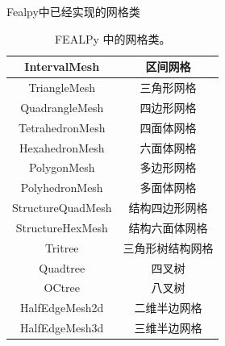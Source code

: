 Fealpy中已经实现的网格类
\begin{table}[H]
	\centering
	\begin{tabular}[c]{|c|c|}\hline
		IntervalMesh      & 区间网格        \\\hline
		TriangleMesh      & 三角形网格       \\\hline
		QuadrangleMesh    & 四边形网格       \\\hline
		TetrahedronMesh   & 四面体网格       \\\hline
		HexahedronMesh    & 六面体网格       \\\hline
		PolygonMesh       & 多边形网格       \\\hline
		PolyhedronMesh    & 多面体网格       \\\hline
		StructureQuadMesh & 结构四边形网格   \\\hline
		StructureHexMesh  & 结构六面体网格   \\\hline
		Tritree           & 三角形树结构网格 \\\hline
		Quadtree          & 四叉树           \\\hline
		OCtree            & 八叉树           \\\hline
		HalfEdgeMesh2d    & 二维半边网格     \\\hline
		HalfEdgeMesh3d    & 三维半边网格     \\\hline
	\end{tabular}
	\caption{FEALPy 中的网格类。}
\end{table}

